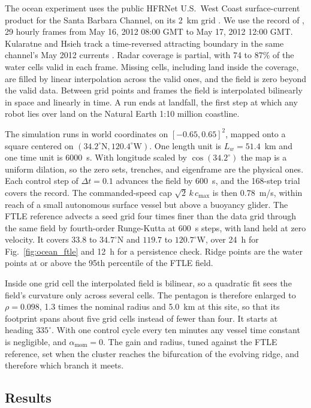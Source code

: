 \documentclass[lettersize,journal]{IEEEtran}
\begin{document}
The ocean experiment uses the public HFRNet U.S.~West Coast surface-current
product for the Santa Barbara Channel, on its 2~km grid \cite{34,38}. We
use the record of \cite{26}, 29 hourly frames from May 16, 2012 08:00 GMT
to May 17, 2012 12:00 GMT. Kularatne and Hsieh track a time-reversed
attracting boundary in the same channel's May 2012 currents \cite{29}.
Radar coverage is partial, with 74 to 87\% of the water cells valid in
each frame. Missing cells, including land inside the coverage, are filled
by linear interpolation across the valid ones, and the field is zero
beyond the valid data. Between grid points and frames the field is
interpolated bilinearly in space and linearly in time. A run ends at
landfall, the first step at which any robot lies over land on the Natural
Earth 1:10 million coastline.

The simulation runs in world coordinates on $[-0.65, 0.65]^2$, mapped onto
a square centered on $(34.2^{\circ}\mathrm{N}, 120.4^{\circ}\mathrm{W})$.
One length unit is $L_w = 51.4$~km and one time unit is 6000~s. With
longitude scaled by $\cos(34.2^{\circ})$ the map is a uniform dilation, so
the zero sets, trenches, and eigenframe are the physical ones. Each control
step of $\Delta t = 0.1$ advances the field by 600~s, and the 168-step trial
covers the record. The commanded-speed cap $\sqrt{2}\,k\,c_{\max}$ is then
0.78~m/s, within reach of a small autonomous surface vessel but above a
buoyancy glider. The FTLE reference advects a seed grid four times finer than the data grid
through the same field by fourth-order Runge-Kutta at 600~s steps, with
land held at zero velocity. It covers $33.8$ to $34.7^{\circ}$N and $119.7$
to $120.7^{\circ}$W, over 24~h for Fig.~\ref{fig:ocean_ftle} and 12~h for
a persistence check. Ridge points are the water points at or above the
95th percentile of the FTLE field.

Inside one grid cell the interpolated field is bilinear, so a quadratic fit
sees the field's curvature only across several cells. The pentagon is
therefore enlarged to $\rho = 0.098$, 1.3 times the nominal radius and
5.0~km at this site, so that its footprint spans about five grid cells
instead of fewer than four. It starts at heading $335^\circ$. With one
control cycle every ten minutes any vessel time constant is negligible,
and $\alpha_{\text{mom}} = 0$. The gain and radius, tuned against the FTLE
reference, set when the cluster reaches the bifurcation of the evolving
ridge, and therefore which branch it meets.

\subsection{Results}
\label{sec:disc_ocean}
\end{document}
